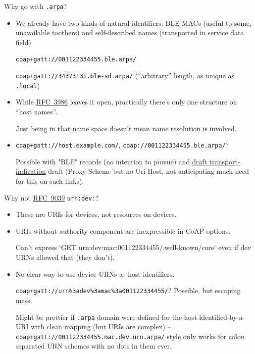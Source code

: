 \documentclass[aspectratio=169,colorlinks]{beamer}
\newcommand{\rfc}[1]{\href{https://datatracker.ietf.org/doc/html/rfc#1}{RFC~#1}}
\newcommand{\ietfdraft}[1]{\href{https://datatracker.ietf.org/doc/draft-#1/}{draft #1}}
\begin{document}
\begin{frame}{Why go with \texttt{.arpa}?}\Large
	\begin{itemize}
	  \item We already have two kinds of natural identifiers: BLE MACs (useful to some, unavailable toothers) and self-described names (transported in service data field)

	    \normalsize

	  \texttt{coap+gatt://001122334455.ble.arpa/}

	  \texttt{coap+gatt://34373131.ble-sd.arpa/} (``arbitrary'' length, as unique as \texttt{.local})

	\item \Large While \rfc{3986} leaves it open, practically there's only one structure on ``host names''.

	  \normalsize

	  Just being in that name space doesn't mean name resolution is involved.

	\item \Large \texttt{coap+gatt://host.example.com/}, \texttt{coap://001122334455.ble.arpa/}?

	  \normalsize

	  Possible with "BLE" records (no intention to pursue) and \ietfdraft{transport-indication} draft (Proxy-Scheme but no Uri-Host, not anticipating much need for this on such links).
	\end{itemize}
\end{frame}

\begin{frame}{Why not \rfc{9039} \texttt{urn:dev:}?}\Large
	\begin{itemize}
		\item These are URIs for devices, not resources on devices.
			\bigskip
		\item URIs without authority component are inexpressible in CoAP options.
			\bigskip
			\normalsize

			Can't express `GET urn:dev:mac:001122334455/.well-known/core` even if dev URNs allowed that (they don't).

			\bigskip

		\item \Large No clear way to use device URNs as host identifiers.
			\bigskip

			\normalsize

			\texttt{coap+gatt://urn\%3adev\%3amac\%3a001122334455/}?
			Possible, but escaping mess.

			Might be prettier if \texttt{.arpa} domain were defined for the-host-identified-by-a-URI with clean mapping (but URIs are complex) -- \texttt{coap+gatt://001122334455.mac.dev.urn.arpa/} style only works for colon separated URN schemes with no dots in them ever.
	\end{itemize}
\end{frame}
\end{document}
